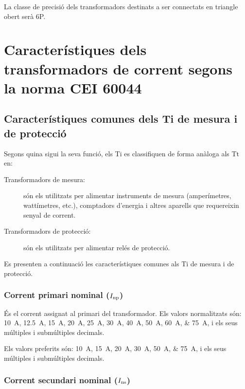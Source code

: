 La classe de precisió dels transformadors destinats a ser connectats en triangle obert serà 6P.

\section{Característiques dels transformadors de corrent segons la norma  CEI 60044}

\subsection{Característiques comunes dels Ti de mesura i de protecció}

Segons quina sigui la seva funció, els Ti es classifiquen de forma
anàloga als Tt en:
\begin{description}
   \item [\hspace{5mm}Transformadors de mesura:] són els utilitzats per alimentar
            instruments de mesura (amperímetres, wattímetres, etc.),
            comptadors d'energia i altres aparells que requereixin senyal de corrent.
   \item [\hspace{5mm}Transformadors de protecció:] són els utilitzats per
   alimentar relés de protecció.
\end{description}

Es presenten a continuació les característiques comunes als Ti de
mesura i de protecció.


\subsubsection{Corrent primari nominal ($I_\mathrm{np}$)}

 És el corrent assignat al
primari del transformador. Els valors normalitzats
són: \SIlist{10; 12,5; 15; 20; 25;30; 40; 50; 60;75}{A}, i els
seus múltiples i submúltiples decimals.

Els valors preferits són: \SIlist{10; 15; 20; 30; 50;75}{A}, i els
seus múltiples i submúltiples decimals.


\subsubsection{Corrent secundari nominal ($I_\mathrm{ns}$)}

